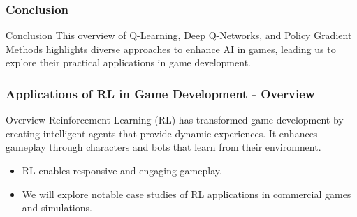 \documentclass[aspectratio=169]{beamer}
\begin{document}
\begin{frame}[fragile]
    \frametitle{Conclusion}
    \begin{block}{Conclusion}
        This overview of Q-Learning, Deep Q-Networks, and Policy Gradient Methods highlights diverse approaches to enhance AI in games, leading us to explore their practical applications in game development.
    \end{block}
\end{frame}

\begin{frame}[fragile]
    \frametitle{Applications of RL in Game Development - Overview}
    \begin{block}{Overview}
        Reinforcement Learning (RL) has transformed game development by creating intelligent agents that provide dynamic experiences. It enhances gameplay through characters and bots that learn from their environment.
    \end{block}
    \begin{itemize}
        \item RL enables responsive and engaging gameplay.
        \item We will explore notable case studies of RL applications in commercial games and simulations.
    \end{itemize}
\end{frame}
\end{document}

